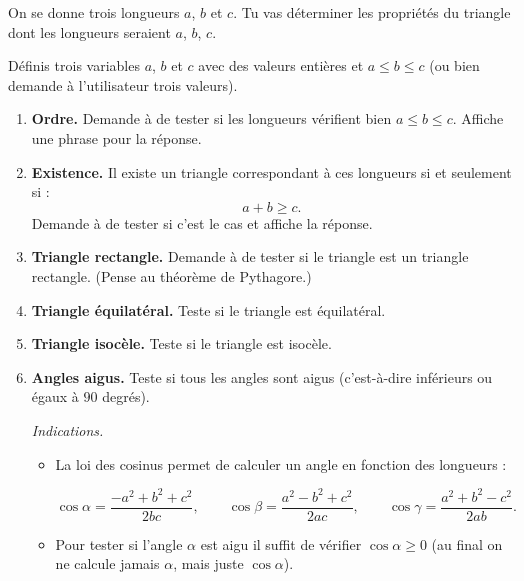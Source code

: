 \documentclass[11pt,class=report,crop=false]{standalone}
\begin{document}
\begin{activite}[Triangles]


On se donne trois longueurs $a$, $b$ et $c$. Tu vas déterminer les propriétés du triangle dont les longueurs seraient $a$, $b$, $c$.



Définis trois variables $a$, $b$ et $c$ avec des valeurs entières et $a \le b \le c$
(ou bien demande à l'utilisateur trois valeurs).

\begin{enumerate}
  \item \textbf{Ordre.} Demande à \Python{} de tester si les longueurs vérifient bien $a \le b \le c$. Affiche une phrase pour la réponse.
  
  \item \textbf{Existence.} Il existe un triangle correspondant à ces longueurs si et seulement si :
  $$a + b \ge c.$$
  Demande à \Python{} de tester si c'est le cas et affiche la réponse.
  
  
  \item  \textbf{Triangle rectangle.} Demande à \Python{} de tester si le triangle est un triangle rectangle. (Pense au théorème de Pythagore.)
  
   \item  \textbf{Triangle équilatéral.} Teste si le triangle est équilatéral. 
   
   \item  \textbf{Triangle isocèle.} Teste si le triangle est isocèle.   
   
   \item  \textbf{Angles aigus.} Teste si tous les angles sont aigus (c'est-à-dire inférieurs ou égaux à $90$ degrés).
   
    \emph{Indications.} 
    \begin{itemize}
      \item La loi des cosinus permet de calculer un angle en fonction des longueurs :
      
   
   $$\cos \alpha = \frac{-a^2+b^2+c^2}{2bc},
   \qquad
   \cos \beta = \frac{a^2-b^2+c^2}{2ac},
   \qquad
   \cos \gamma = \frac{a^2+b^2-c^2}{2ab}.$$   

   \smallskip
   
    \item Pour tester si l'angle $\alpha$ est aigu il suffit de vérifier $\cos \alpha \ge 0$ (au final on ne calcule jamais $\alpha$, mais juste $\cos \alpha$).
   
   \end{itemize} 
   
\end{enumerate}   
     
    \smallskip 
     
    
\end{activite}
\end{document}
